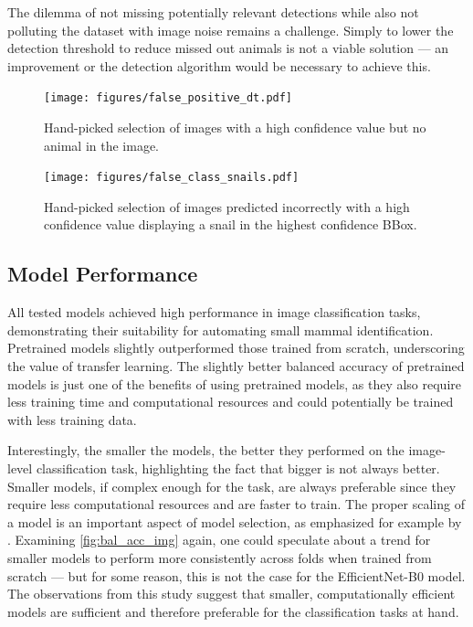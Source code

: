 The dilemma of not missing potentially relevant detections while also not polluting the dataset with image noise remains a challenge.
Simply to lower the detection threshold to reduce missed out animals is not a viable solution --- an improvement or the detection algorithm would be necessary to achieve this.

\begin{figure}[ht]
\centering
\texttt{[image: figures/false\_positive\_dt.pdf]}
\caption{Hand-picked selection of images with a high confidence value but no animal in the image.}
\label{fig:false_positive_dt}
\end{figure}

\begin{figure}[ht]
\centering
\texttt{[image: figures/false\_class\_snails.pdf]}
\caption{Hand-picked selection of images predicted incorrectly with a high confidence value displaying a snail in the highest confidence BBox.}
\label{fig:false_class_snails}
\end{figure}

\subsection{Model Performance}
All tested models achieved high performance in image classification tasks, demonstrating their suitability for automating small mammal identification.
Pretrained models slightly outperformed those trained from scratch, underscoring the value of transfer learning.
The slightly better balanced accuracy of pretrained models is just one of the benefits of using pretrained models, as they also require less training time and computational resources and could potentially be trained with less training data.

Interestingly, the smaller the models, the better they performed on the image-level classification task, highlighting the fact that bigger is not always better.
Smaller models, if complex enough for the task, are always preferable since they require less computational resources and are faster to train.
The proper scaling of a model is an important aspect of model selection, as emphasized for example by \textcite{tanEfficientNetRethinkingModel2019}.
Examining \autoref{fig:bal_acc_img} again, one could speculate about a trend for smaller models to perform more consistently across folds when trained from scratch --- but for some reason, this is not the case for the EfficientNet-B0 model.
The observations from this study suggest that smaller, computationally efficient models are sufficient and therefore preferable for the classification tasks at hand.

